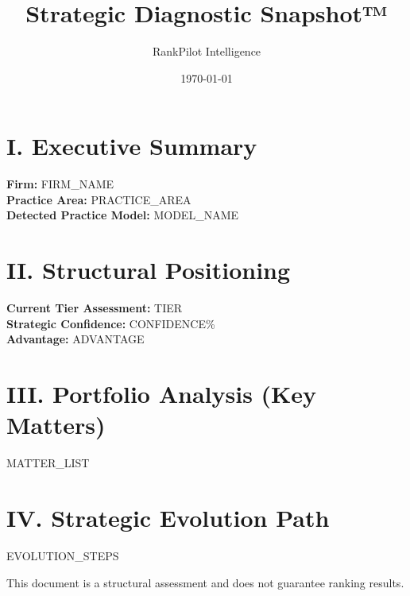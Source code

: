 \documentclass[11pt]{article}
\title{\textbf{Strategic Diagnostic Snapshot™}}
\author{RankPilot Intelligence}
\date{\today}
\begin{document}
\maketitle

\section*{I. Executive Summary}
\textbf{Firm:} {{FIRM_NAME}} \\
\textbf{Practice Area:} {{PRACTICE_AREA}} \\
\textbf{Detected Practice Model:} {{MODEL_NAME}}

\section*{II. Structural Positioning}
\textbf{Current Tier Assessment:} {{TIER}} \\
\textbf{Strategic Confidence:} {{CONFIDENCE}}\% \\
\textbf{Advantage:} {{ADVANTAGE}}

\section*{III. Portfolio Analysis (Key Matters)}
\begin{itemize}
{{MATTER_LIST}}
\end{itemize}

\section*{IV. Strategic Evolution Path}
\begin{itemize}
{{EVOLUTION_STEPS}}
\end{itemize}

\vfill
\centering
\small{This document is a structural assessment and does not guarantee ranking results.}
\end{document}

